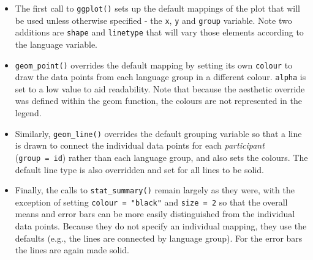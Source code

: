 \documentclass[
  english,
  doc,floatsintext]{apa6}
\providecommand{\tightlist}{%
  \setlength{\itemsep}{0pt}\setlength{\parskip}{0pt}}
\begin{document}
\begin{itemize}
\tightlist
\item
  The first call to \texttt{ggplot()} sets up the default mappings of the plot that will be used unless otherwise specified - the \texttt{x}, \texttt{y} and \texttt{group} variable. Note two additions are \texttt{shape} and \texttt{linetype} that will vary those elements according to the language variable.
\item
  \texttt{geom\_point()} overrides the default mapping by setting its own \texttt{colour} to draw the data points from each language group in a different colour. \texttt{alpha} is set to a low value to aid readability. Note that because the aesthetic override was defined within the geom function, the colours are not represented in the legend.
\item
  Similarly, \texttt{geom\_line()} overrides the default grouping variable so that a line is drawn to connect the individual data points for each \emph{participant} (\texttt{group\ =\ id}) rather than each language group, and also sets the colours. The default line type is also overridden and set for all lines to be solid.
\item
  Finally, the calls to \texttt{stat\_summary()} remain largely as they were, with the exception of setting \texttt{colour\ =\ "black"} and \texttt{size\ =\ 2} so that the overall means and error bars can be more easily distinguished from the individual data points. Because they do not specify an individual mapping, they use the defaults (e.g., the lines are connected by language group). For the error bars the lines are again made solid.
\end{itemize}
\end{document}
